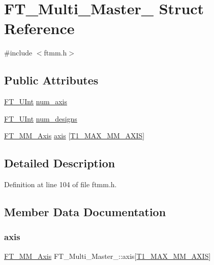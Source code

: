 \hypertarget{struct_f_t___multi___master__}{}\section{F\+T\+\_\+\+Multi\+\_\+\+Master\+\_\+ Struct Reference}
\label{struct_f_t___multi___master__}


{\ttfamily \#include $<$ftmm.\+h$>$}

\subsection*{Public Attributes}
\begin{DoxyCompactItemize}
\item 
\mbox{\hyperlink{fttypes_8h_abcb8db4dbf35d2b55a9e8c7b0926dc52}{F\+T\+\_\+\+U\+Int}} \mbox{\hyperlink{struct_f_t___multi___master___a90a0ace4e40b91912259ad52fc86fb6f}{num\+\_\+axis}}
\item 
\mbox{\hyperlink{fttypes_8h_abcb8db4dbf35d2b55a9e8c7b0926dc52}{F\+T\+\_\+\+U\+Int}} \mbox{\hyperlink{struct_f_t___multi___master___a78b797ee560f4b00795a7dce9656178d}{num\+\_\+designs}}
\item 
\mbox{\hyperlink{ftmm_8h_a3af0f0b8fec16073eb9795eb69a645ee}{F\+T\+\_\+\+M\+M\+\_\+\+Axis}} \mbox{\hyperlink{struct_f_t___multi___master___a1eb062ff3b5ac245ab9421a46b349818}{axis}} \mbox{[}\mbox{\hyperlink{t1tables_8h_a471108ae668a65363dd36bb17e1ecbbe}{T1\+\_\+\+M\+A\+X\+\_\+\+M\+M\+\_\+\+A\+X\+IS}}\mbox{]}
\end{DoxyCompactItemize}


\subsection{Detailed Description}


Definition at line 104 of file ftmm.\+h.



\subsection{Member Data Documentation}
\mbox{\label{struct_f_t___multi___master___a1eb062ff3b5ac245ab9421a46b349818}} 
\subsubsection{\texorpdfstring{axis}{axis}}
{\footnotesize\ttfamily \mbox{\hyperlink{ftmm_8h_a3af0f0b8fec16073eb9795eb69a645ee}{F\+T\+\_\+\+M\+M\+\_\+\+Axis}} F\+T\+\_\+\+Multi\+\_\+\+Master\+\_\+\+::axis\mbox{[}\mbox{\hyperlink{t1tables_8h_a471108ae668a65363dd36bb17e1ecbbe}{T1\+\_\+\+M\+A\+X\+\_\+\+M\+M\+\_\+\+A\+X\+IS}}\mbox{]}}



